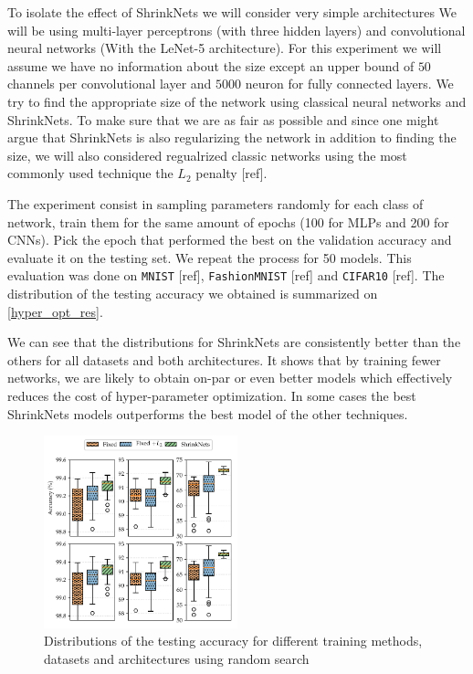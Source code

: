 \documentclass[sigconf]{acmart}
\begin{document}
\par To isolate the effect of ShrinkNets we will consider very simple architectures
We will be using multi-layer perceptrons (with three hidden layers) and
convolutional neural networks (With the LeNet-5 architecture). For this experiment
we will assume we have no information about the size except an upper bound of
$50$ channels per convolutional layer and $5000$ neuron for fully connected layers.
We try to find the appropriate size of the network using classical neural networks
and ShrinkNets. To make sure that we are as fair as possible and since one might
argue that ShrinkNets is also regularizing the network in addition to finding the
size, we will also considered regualrized classic networks using the most commonly
used technique the $L_2$ penalty [ref].
\par The experiment consist in sampling parameters randomly for each class of
network, train them for the same amount of epochs (100 for MLPs and 200 for CNNs). Pick the epoch that performed the best on the validation accuracy and evaluate it
on the testing set. We repeat the process for 50 models. This evaluation was done
on \texttt{MNIST} [ref], \texttt{FashionMNIST} [ref] and \texttt{CIFAR10} [ref]. The distribution of the testing accuracy we obtained is summarized on \autoref{hyper_opt_res}.

We can see that the distributions for ShrinkNets are consistently better than the
others for all datasets and both architectures. It shows that by training fewer
networks, we are likely to obtain on-par or even better models which effectively
reduces the cost of hyper-parameter optimization. In some cases the best ShrinkNets
models outperforms the best model of the other techniques.

\begin{figure}
\begin{center}
  \includegraphics[width=0.5\textwidth]{hyper_opt}
\caption{Distributions of the testing accuracy for different training methods, datasets and architectures using random search\label{hyper_opt_res}}
\end{center}
\end{figure}
\end{document}
